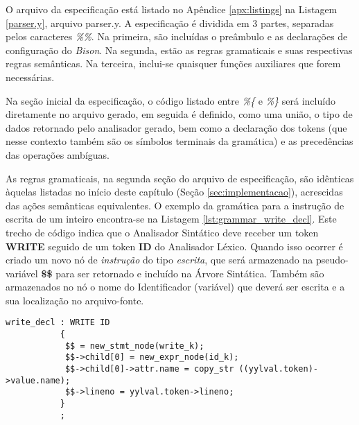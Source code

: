 O arquivo da especificação está listado no Apêndice \ref{apx:listings} na Listagem
\ref{parser.y}, arquivo parser.y. A especificação é dividida em 3 partes,
separadas pelos caracteres \emph{\%\%}. Na primeira, são incluídas o preâmbulo
e as declarações de configuração do \emph{Bison}. Na segunda, estão as regras
gramaticais e suas respectivas regras semânticas. Na terceira, inclui-se
quaisquer funções auxiliares que forem necessárias.

Na seção inicial da especificação, o código listado entre \emph{\%\{} e
\emph{\%\}} será incluído diretamente no arquivo gerado, em seguida é
definido, como uma união, o tipo de dados retornado pelo analisador gerado,
bem como a declaração dos tokens (que nesse contexto também são os símbolos
terminais da gramática) e as precedências das operações ambíguas.

As regras gramaticais, na segunda seção do arquivo de especificação, são
idênticas àquelas listadas no início deste capítulo (Seção
\ref{sec:implementacao}), acrescidas das ações semânticas equivalentes. O
exemplo da gramática para a instrução de escrita de um inteiro encontra-se
na Listagem \ref{lst:grammar_write_decl}. Este trecho de código indica que o
Analisador Sintático deve receber um token \textbf{WRITE} seguido de um token
\textbf{ID} do Analisador Léxico. Quando isso ocorrer é criado um novo nó de
\emph{instrução} do tipo \emph{escrita}, que será armazenado na
pseudo-variável \textbf{\$\$} para ser retornado e incluído na Árvore
Sintática. Também são armazenados no nó o nome do Identificador (variável) que
deverá ser escrita e a sua localização no arquivo-fonte.

\begin{lstlisting}[label=lst:grammar_write_decl,caption=Instrução de Escrita]
write_decl : WRITE ID
           {
            $$ = new_stmt_node(write_k);
            $$->child[0] = new_expr_node(id_k);
            $$->child[0]->attr.name = copy_str ((yylval.token)->value.name);
            $$->lineno = yylval.token->lineno;
           }
           ;
\end{lstlisting}


